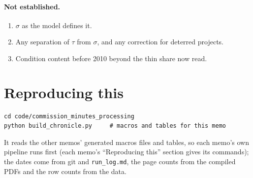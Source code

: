 \documentclass[11pt]{article}
\begin{document}
\paragraph{Not established.}
\begin{enumerate}
\item $\sigma$ as the model defines it.
\item Any separation of $\tau$ from $\sigma$, and any correction for deterred projects.
\item Condition content before 2010 beyond the thin share now read.
\end{enumerate}

\section{Reproducing this}\label{sec:chrepro}

\begin{verbatim}
cd code/commission_minutes_processing
python build_chronicle.py     # macros and tables for this memo
\end{verbatim}
It reads the other memos' generated macros files and tables, so each memo's own pipeline runs
first (each memo's ``Reproducing this'' section gives its commands); the dates come from git and
\texttt{run\_log.md}, the page counts from the compiled PDFs and the row counts from the data.
\end{document}
